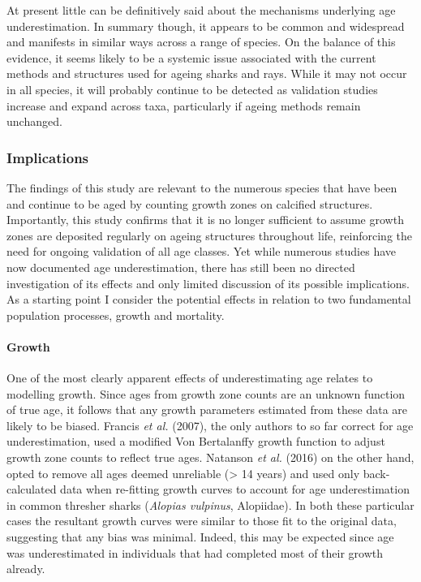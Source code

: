 \documentclass[]{article}
\let\oldparagraph\paragraph
\renewcommand{\paragraph}[1]{\oldparagraph{#1}\mbox{}}
\begin{document}
At present little can be definitively said about the mechanisms
underlying age underestimation. In summary though, it appears to be
common and widespread and manifests in similar ways across a range of
species. On the balance of this evidence, it seems likely to be a
systemic issue associated with the current methods and structures used
for ageing sharks and rays. While it may not occur in all species, it
will probably continue to be detected as validation studies increase and
expand across taxa, particularly if ageing methods remain unchanged.

\subsubsection{Implications}\label{implications}

The findings of this study are relevant to the numerous species that
have been and continue to be aged by counting growth zones on calcified
structures. Importantly, this study confirms that it is no longer
sufficient to assume growth zones are deposited regularly on ageing
structures throughout life, reinforcing the need for ongoing validation
of all age classes. Yet while numerous studies have now documented age
underestimation, there has still been no directed investigation of its
effects and only limited discussion of its possible implications. As a
starting point I consider the potential effects in relation to two
fundamental population processes, growth and mortality.

\paragraph{Growth}\label{growth}

One of the most clearly apparent effects of underestimating age relates
to modelling growth. Since ages from growth zone counts are an unknown
function of true age, it follows that any growth parameters estimated
from these data are likely to be biased. Francis \emph{et al.} (2007),
the only authors to so far correct for age underestimation, used a
modified Von Bertalanffy growth function to adjust growth zone counts to
reflect true ages. Natanson \emph{et al.} (2016) on the other hand,
opted to remove all ages deemed unreliable (\textgreater{} 14 years) and
used only back-calculated data when re-fitting growth curves to account
for age underestimation in common thresher sharks (\emph{Alopias
vulpinus}, Alopiidae). In both these particular cases the resultant
growth curves were similar to those fit to the original data, suggesting
that any bias was minimal. Indeed, this may be expected since age was
underestimated in individuals that had completed most of their growth
already.
\end{document}
